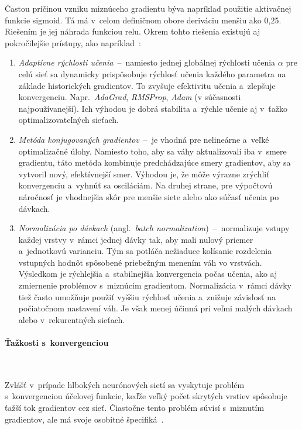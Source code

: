         Častou príčinou vzniku miznúceho gradientu býva napríklad použitie aktivačnej funkcie sigmoid. Tá má v~celom definičnom obore deriváciu menšiu ako 0,25. Riešením je jej náhrada funkciou \acrshort{relu}. Okrem tohto riešenia existujú aj pokročilejšie prístupy, ako napríklad~\cite{aggarwalNeuralNetworksDeep2018}:
        \begin{enumerate}
          \item \emph{Adaptívne rýchlosti učenia}~--~namiesto jednej globálnej rýchlosti učenia $\alpha$ pre celú sieť sa dynamicky prispôsobuje rýchlosť učenia každého parametra na základe historických gradientov. To zvyšuje efektivitu učenia a~zlepšuje konvergenciu. Napr.\ \emph{AdaGrad}, \emph{RMSProp}, \emph{Adam} (v súčasnosti najpoužívanejší). Ich výhodou je dobrá stabilita a~rýchle učenie aj v~ťažko optimalizovateľných sieťach.
          \item \emph{Metóda konjugovaných gradientov}~--~je vhodná pre nelineárne a~veľké optimalizačné úlohy. Namiesto toho, aby sa váhy aktualizovali iba v~smere gradientu, táto metóda kombinuje predchádzajúce smery gradientov, aby sa vytvoril nový, efektívnejší smer. Výhodou je, že môže výrazne zrýchliť konvergenciu a~vyhnúť sa osciláciám. Na druhej strane, pre výpočtovú náročnosť je vhodnejšia skôr pre menšie siete alebo ako súčasť učenia po dávkach.
          \item \emph{Normalizácia po dávkach} (angl.\ \emph{batch normalization})~--~normalizuje vstupy každej vrstvy v~rámci jednej dávky tak, aby mali nulový priemer a~jednotkovú varianciu. Tým sa potláča nežiaduce kolísanie rozdelenia vstupných hodnôt spôsobené priebežným menením váh vo vrstvách. Výsledkom je rýchlejšia a~stabilnejšia konvergencia počas učenia, ako aj zmiernenie problémov s~miznúcim gradientom. Normalizácia v~rámci dávky tiež často umožňuje použiť vyššiu rýchlosť učenia a~znižuje závislosť na počiatočnom nastavení váh. Je však menej účinná pri veľmi malých dávkach alebo v~rekurentných sieťach.
        \end{enumerate}

      \paragraph{Ťažkosti s~konvergenciou} \

        \noindent Zvlášť v~prípade hlbokých neurónových sietí sa vyskytuje problém s~konvergenciou účelovej funkcie, keďže veľký počet skrytých vrstiev spôsobuje ťažší tok gradientov cez sieť. Čiastočne tento problém súvisí s~miznutím gradientov, ale má svoje osobitné špecifiká~\cite{aggarwalNeuralNetworksDeep2018}.

